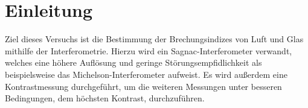\section{Einleitung}
Ziel dieses Versuchs ist die Bestimmung der Brechungsindizes von Luft und Glas mithilfe der Interferometrie. Hierzu wird ein Sagnac-Interferometer verwandt, welches eine höhere Auflösung und
geringe Störungsempfidlichkeit als beispielsweise das Michelson-Interferometer aufweist.
Es wird außerdem eine Kontrastmessung durchgeführt, um die weiteren Messungen unter besseren Bedingungen, dem höchsten Kontrast, durchzuführen.
